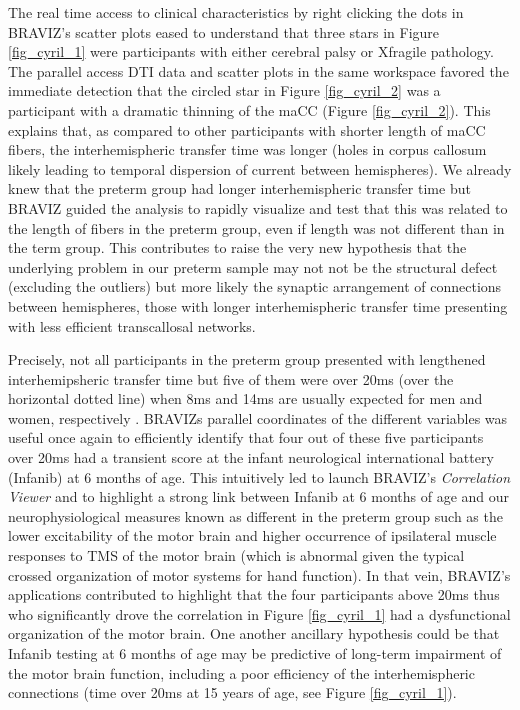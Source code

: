 \documentclass{frontiersHLTH}
\begin{document}
The real time access to clinical characteristics by right clicking the dots in BRAVIZ’s scatter plots eased to understand that three stars in Figure \ref{fig_cyril_1} were participants with either cerebral palsy or Xfragile pathology. The parallel access DTI data and scatter plots in the same workspace  favored the immediate detection that the circled star in Figure \ref{fig_cyril_2} was a participant with a dramatic thinning of the maCC (Figure \ref{fig_cyril_2}). This explains that, as compared to other participants with shorter length of maCC fibers,  the interhemispheric transfer time was longer (holes in corpus callosum likely leading to temporal dispersion of current between hemispheres).  We already knew that the preterm group had longer interhemispheric transfer time \cite{schneider_cerebral_2012} but BRAVIZ guided the analysis to rapidly visualize and test that this was related to the length of fibers in the preterm group, even if length was not different than in the term group. This contributes to raise the very new hypothesis that the underlying problem in our preterm sample may not not be the structural defect (excluding the outliers) but more likely the synaptic arrangement of connections between hemispheres, those with longer interhemispheric transfer time presenting with less efficient transcallosal networks.

Precisely, not all participants in the preterm group presented with lengthened interhemipsheric transfer time but five of them were over 20ms (over the horizontal dotted line) when 8ms and 14ms are usually expected for men and women, respectively \cite{schneider_cerebral_2012}. BRAVIZs parallel coordinates of the different variables was useful once again to efficiently identify that four out of these five participants over 20ms had a transient score at the infant neurological international battery (Infanib) at 6 months of age. This intuitively led to launch BRAVIZ’s  \emph{Correlation Viewer} and to highlight a strong link between Infanib at 6 months of age and our neurophysiological measures known as different in the preterm group \cite{schneider_cerebral_2012} such as the lower excitability of the motor brain and higher occurrence of ipsilateral muscle responses to TMS of the motor brain (which is abnormal given the typical crossed organization of motor systems for hand function). In that vein, BRAVIZ’s applications contributed to highlight that the four participants above 20ms thus who significantly drove the correlation in Figure \ref{fig_cyril_1} had a dysfunctional organization of the motor brain. One another ancillary hypothesis could be that Infanib testing at 6 months of age may be predictive of long-term impairment of the motor brain function, including a poor efficiency of the interhemispheric connections (time over 20ms at 15 years of age, see Figure \ref{fig_cyril_1}).
\end{document}
